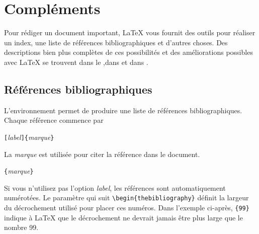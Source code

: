 


\chapter{Compléments}
\label{chap:spec}
\thispagestyle{plain}

\begin{intro}

Pour rédiger un document important, \LaTeX{} vous fournit des outils
pour réaliser un index, une liste de références bibliographiques et
d'autres choses. Des descriptions bien plus complètes de ces possibilités
et des améliorations possibles avec \LaTeX{} se trouvent
dans le {\normalfont\manual{}},dans {\normalfont\companion{}}
et dans {\normalfont\desgraupes{}}.
\end{intro}

\section{Références bibliographiques}

L'environnement  permet de produire une liste de
références bibliographiques.  Chaque référence
commence par
\begin{lscommand}
\verb|[|\emph{label}\verb|]{|\emph{marque}\verb|}|
\end{lscommand}
La \emph{marque} est utilisée pour citer la référence dans le
document.
\begin{lscommand}
\verb|{|\emph{marque}\verb|}|
\end{lscommand}
Si vous n'utilisez pas l'option \emph{label}, les références sont
automatiquement numérotées. Le paramètre qui suit
\verb|\begin{thebibliography}| définit la largeur du décrochement
utilisé pour placer ces numéros. Dans l'exemple ci-après,
\verb|{99}| indique à \LaTeX{} que le décrochement ne devrait jamais
être plus large que le nombre 99.

